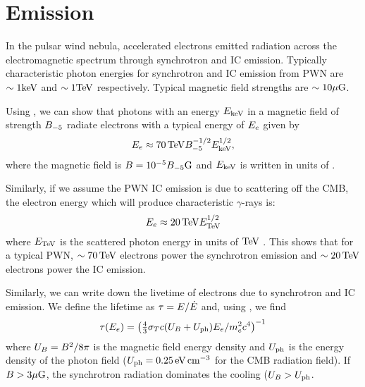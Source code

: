 \section{ Emission}

In the pulsar wind nebula, accelerated electrons emitted radiation across
the electromagnetic spectrum through synchrotron and \ac{IC} emission.
Typically characteristic photon energies for synchrotron and \ac{IC}
emission from \ac{PWN} are $\sim1\text{keV}$ and $\sim1\text{TeV}$ respectively.
Typical magnetic field strengths are $\sim10\mu\text{G}$.

Using , we can show that
photons with an energy $E_\text{keV}$ in a magnetic field of strength
$B_{-5}$ radiate electrons with a typical energy of
$E_e$ given by
\begin{equation}
  E_e \approx  70\,\text{TeV} B_{-5}^{-1/2} E_\text{keV}^{1/2},
\end{equation}
where the magnetic field is $B=10^{-5}
B_{-5}\text{G}$ and $E_\text{keV}$ is written in units of \kev
\citep{de-jager_2009a_implications-observations}.

Similarly, if we assume the \ac{PWN} \ac{IC} emission is due to scattering
off the \ac{CMB}, the electron energy which will produce characteristic
\tev $\gamma$-rays is:
\begin{equation}
  E_e \approx 20\,\text{TeV} E_\text{TeV}^{1/2}
\end{equation}
where $E_\text{TeV}$ is the scattered photon energy in units of $\text{TeV}$
\citep{de-jager_2009a_implications-observations}.  This shows that for a
typical \ac{PWN}, $\sim70\,\text{TeV}$ electrons power the synchrotron
emission and $\sim20\,\text{TeV}$ electrons power the \ac{IC} emission.

Similarly, we can write down the livetime of electrons due to
synchrotron and \ac{IC} emission. We define the lifetime as $\tau =
E/\dot{E}$ and, using \cite{rybicki_1979a_radiative-processes},
we find
\begin{equation}
  \tau(E_e) = 
  \left(
  \tfrac{4}{3} \sigma_T c (U_B + U_\text{ph}) 
  E_e/ m_e^2c^4
  \right)^{-1}
\end{equation}
where $U_B = B^2/8\pi$
is the magnetic field energy density and
$U_\text{ph}$ is the energy density of the photon field
($U_\text{ph}=0.25\,\text{eV}\,\text{cm}^{-3}$
for the \ac{CMB} radiation field).  If $B>3\mu\text{G}$, the synchrotron
radiation dominates the cooling ($U_B >
U_\text{ph}$.

